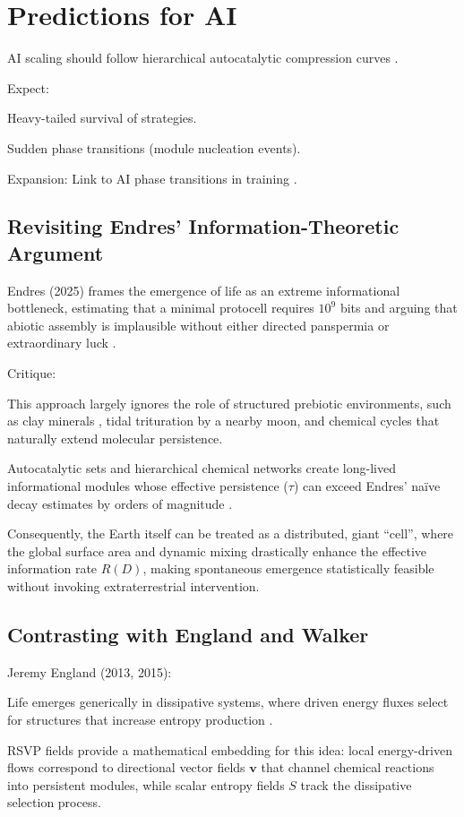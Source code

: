 \documentclass[openany]{book}
\begin{document}
\chapter{Predictions for AI}
AI scaling should follow hierarchical autocatalytic compression curves \citep{scalinghypothesis}.

Expect:

Heavy-tailed survival of strategies.

Sudden phase transitions (module nucleation events).

Expansion: Link to AI phase transitions in training \citep{day2024}.

\section{Revisiting Endres’ Information-Theoretic Argument}
Endres (2025) frames the emergence of life as an extreme informational bottleneck, estimating that a minimal protocell requires $10^9$ bits and arguing that abiotic assembly is implausible without either directed panspermia or extraordinary luck \citep{endres2025}.

Critique:

This approach largely ignores the role of structured prebiotic environments, such as clay minerals \citep{hazen2005}, tidal trituration by a nearby moon, and chemical cycles that naturally extend molecular persistence.

Autocatalytic sets and hierarchical chemical networks create long-lived informational modules whose effective persistence ($\tau$) can exceed Endres’ naïve decay estimates by orders of magnitude \citep{vasas2010}.

Consequently, the Earth itself can be treated as a distributed, giant “cell”, where the global surface area and dynamic mixing drastically enhance the effective information rate $R(D)$, making spontaneous emergence statistically feasible without invoking extraterrestrial intervention.

\section{Contrasting with England and Walker}
Jeremy England (2013, 2015):

Life emerges generically in dissipative systems, where driven energy fluxes select for structures that increase entropy production \citep{england2013,england2015}.

RSVP fields provide a mathematical embedding for this idea: local energy-driven flows correspond to directional vector fields $\mathbf{v}$ that channel chemical reactions into persistent modules, while scalar entropy fields $S$ track the dissipative selection process.
\end{document}
